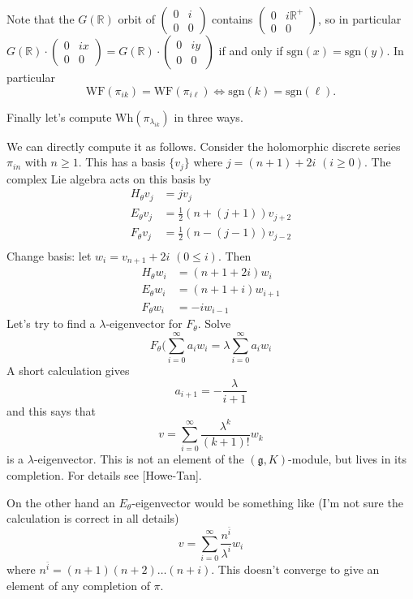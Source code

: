 \documentclass[10pt,leqno]{article}
\numberwithin{equation}{section}
\newcommand{\sgn}{\mathrm{sgn}}
\newcommand{\R}{\mathbb R}
\newcommand{\g}{\mathfrak g}
\newcommand{\Wh}{\mathrm{Wh}}
\newcommand{\WF}{\mathrm{WF}}
\begin{document}
Note that the $G(\R)$ orbit of $\begin{pmatrix}0&i\\0&0
\end{pmatrix}$ contains $\begin{pmatrix}0&i\R^+\\0&0
\end{pmatrix}$,
so in particular $G(\R)\cdot \begin{pmatrix}0&ix\\0&0
\end{pmatrix}=G(\R)\cdot \begin{pmatrix}0&iy\\0&0
\end{pmatrix}$ if and only if $\sgn(x)=\sgn(y)$.
In particular
$$
\WF(\pi_{ik})=\WF(\pi_{i\ell})\Leftrightarrow \sgn(k)=\sgn(\ell).
$$

Finally let's compute $\Wh(\pi_{\lambda_{ik}})$ in three ways.

We can directly compute it as follows. Consider the  holomorphic discrete series $\pi_{in}$ with $n\ge 1$.
This has a basis 
 $\{v_j\}$ where $j=(n+1)+2i$ $(i\ge 0)$. 
The complex Lie algebra acts on this basis by
$$
\begin{aligned}
  H_\theta v_j&=jv_j\\
  E_\theta v_j&= \frac 12(n+(j+1))v_{j+2}\\
  F_\theta v_j&= \frac 12(n-(j-1))v_{j-2}\\
\end{aligned}
$$
Change basis: let $w_i=v_{n+1}+2i$ $(0\le i)$. Then
$$
\begin{aligned}
    H_\theta w_i&=(n+1+2i)w_i\\
  E_\theta w_i&=(n+1+i)w_{i+1}\\
  F_\theta w_i&= -iw_{i-1}
\end{aligned}
$$
Let's try to find a $\lambda$-eigenvector for $F_\theta$.
Solve
$$
F_\theta(\sum_{i=0}^\infty a_iw_i=\lambda\sum_{i=0}^\infty a_iw_i
$$
A short calculation gives
$$
a_{i+1}=-\frac{\lambda}{i+1}
$$
and this says that
$$
v=\sum_{i=0}^\infty \frac{\lambda^k}{(k+1)!}w_k
$$
is a $\lambda$-eigenvector.
This is not an element of the $(\g,K)$-module, but lives in its completion.
For details see [Howe-Tan].

On the other hand an $E_\theta$-eigenvector would be something like (I'm not sure the calculation is correct in all details)
$$
v=\sum_{i=0}^\infty \frac{n^{\bar i}}{\lambda^i} w_i
$$
where $n^{\bar i}=(n+1)(n+2)\dots (n+i)$.
This doesn't converge to give an element of any completion of $\pi$. 
\end{document}
